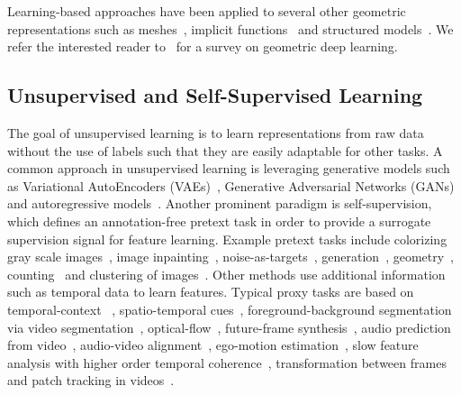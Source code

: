 \documentclass[10pt,twocolumn,letterpaper]{article}
\begin{document}
Learning-based approaches have been applied to several other geometric representations such as meshes~\cite{kanazawa2018learning,ranjan2018generating,wang2018pixel2mesh,poursaeed2020neural}, implicit functions~\cite{mescheder2019occupancy,park2019deepsdf,xu2019disn,poursaeed2020coupling} and structured models~\cite{li2017grass,zou20173d,zhu2018scores}. We refer the interested reader to~\cite{cao2020comprehensive} for a survey on geometric deep learning.   

\subsection{Unsupervised and Self-Supervised Learning}

The goal of unsupervised learning is to learn representations from raw data without the use of labels such that they are easily adaptable for other tasks. 
A common approach in unsupervised learning is leveraging generative models such as Variational AutoEncoders (VAEs)~\cite{kingma2014semi,kingma2013auto,rezende2014stochastic}, Generative Adversarial Networks (GANs)~\cite{goodfellow2014generative,huang2017stacked,radford2015unsupervised,kiapour2020generating} and autoregressive models~\cite{gregor2014deep,van2016conditional,van2016pixel}.   
Another prominent paradigm is self-supervision, which defines an annotation-free pretext task in order to provide a surrogate supervision signal for feature learning. Example pretext tasks include colorizing gray scale images~\cite{larsson2016learning,zhang2016colorful,zhang2017split}, image inpainting~\cite{pathak2016context}, noise-as-targets~\cite{bojanowski2017unsupervised}, generation~\cite{jenni2018self,ren2018cross}, geometry~\cite{dosovitskiy2015discriminative}, counting~\cite{noroozi2017representation} and clustering of images~\cite{caron2018deep,liao2016learning,yang2016joint}. 
Other methods use additional information such as temporal data to learn features. 
Typical proxy tasks are based on temporal-context ~\cite{misra2016shuffle,wei2018learning,sermanet2018time}, spatio-temporal cues~\cite{isola2015learning,gao2016object,wang2017transitive}, foreground-background segmentation via video segmentation~\cite{pathak2017learning}, 
optical-flow~\cite{gan2018geometry,mahendran2018cross},  future-frame synthesis~\cite{srivastava2015unsupervised}, audio prediction from video~\cite{de1994learning,owens2016visually}, audio-video alignment~\cite{arandjelovic2017look}, ego-motion estimation~\cite{jayaraman2016slow}, slow feature analysis with higher order temporal coherence~\cite{jayaraman2016slow}, transformation between frames~\cite{agrawal2015learning} and patch tracking in videos~\cite{wang2015unsupervised}.
\end{document}
